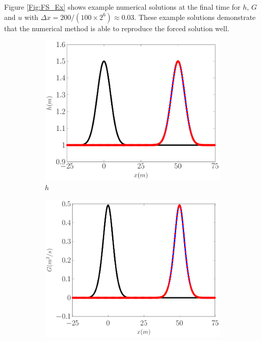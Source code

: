 \documentclass[10pt]{elsarticle}
\begin{document}
Figure \ref{Fig:FS_Ex} shows example numerical solutions at the final time for $h$, $G$ and $u$ with $\Delta x = 200 / (100 \times 2^{6}) \approx 0.03$. These example solutions demonstrate that the numerical method is able to reproduce the forced solution well.
%
\begin{figure}
	\centering
	\begin{subfigure}{0.32\textwidth}
		\centering
		\includegraphics[width=\textwidth]{./Figures/Simulations/Validation/Forced/h.pdf}
		\caption{$h$}
	\end{subfigure}
	\begin{subfigure}{0.32\textwidth}
		\centering
		\includegraphics[width=\textwidth]{./Figures/Simulations/Validation/Forced/G.pdf}

\end{subfigure}
\end{figure}
\end{document}
